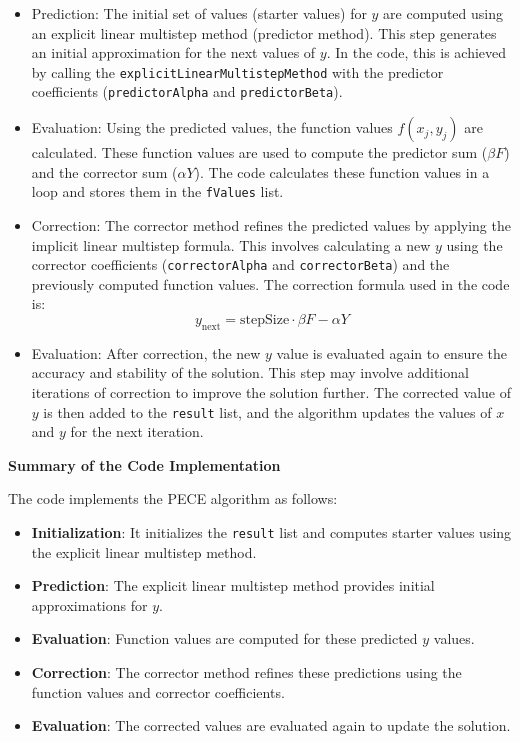 \documentclass[a4paper, twoside]{report} %
\begin{document}
	\begin{itemize}
		\item Prediction: The initial set of values (starter values) for $y$ are computed using an explicit linear multistep method (predictor method). This step generates an initial approximation for the next values of $y$. In the code, this is achieved by calling the \texttt{explicitLinearMultistepMethod} with the predictor coefficients (\texttt{predictorAlpha} and \texttt{predictorBeta}).
		\item Evaluation: Using the predicted values, the function values $f(x_j, y_j)$ are calculated. These function values are used to compute the predictor sum ($\beta F$) and the corrector sum ($\alpha Y$). The code calculates these function values in a loop and stores them in the \texttt{fValues} list.
		\item Correction: The corrector method refines the predicted values by applying the implicit linear multistep formula. This involves calculating a new $y$ using the corrector coefficients (\texttt{correctorAlpha} and \texttt{correctorBeta}) and the previously computed function values. The correction formula used in the code is:
		\[
		y_{\text{next}} = \text{stepSize} \cdot \beta F - \alpha Y
		\]
		\item Evaluation: After correction, the new $y$ value is evaluated again to ensure the accuracy and stability of the solution. This step may involve additional iterations of correction to improve the solution further. The corrected value of $y$ is then added to the \texttt{result} list, and the algorithm updates the values of $x$ and $y$ for the next iteration.
	\end{itemize}




	\textbf{Summary of the Code Implementation}

	The code implements the PECE algorithm as follows:

	\begin{itemize}
		\item \textbf{Initialization}: It initializes the \texttt{result} list and computes starter values using the explicit linear multistep method.
		\item \textbf{Prediction}: The explicit linear multistep method provides initial approximations for $y$.
		\item \textbf{Evaluation}: Function values are computed for these predicted $y$ values.
		\item \textbf{Correction}: The corrector method refines these predictions using the function values and corrector coefficients.
		\item \textbf{Evaluation}: The corrected values are evaluated again to update the solution.
	\end{itemize}
\end{document}
